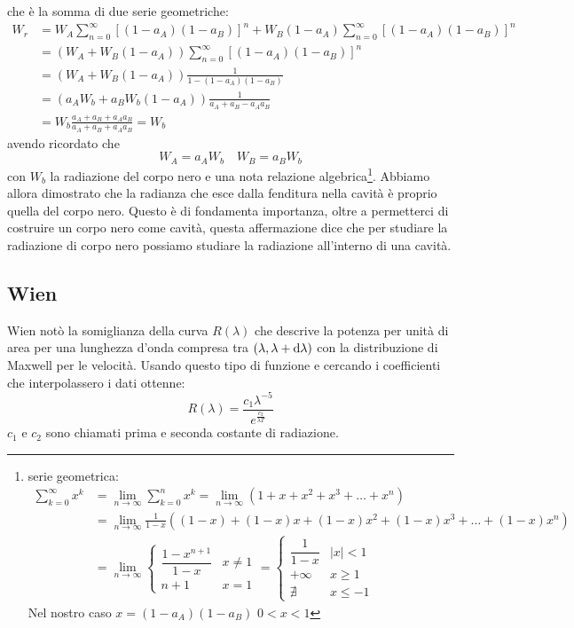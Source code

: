 che è la somma di due serie geometriche:
\begin{equation}
	\begin{split}
		W_r&=W_A\sum_{n=0}^\infty\left[(1-a_A)(1-a_B)\right]^n+W_B(1-a_A)\sum_{n=0}^\infty\left[(1-a_A)(1-a_B)\right]^n\\
		&=\left(W_A+W_B\left(1-a_A\right)\right)\sum_{n=0}^\infty\left[(1-a_A)(1-a_B)\right]^n\\
		&=\left(W_A+W_B\left(1-a_A\right)\right)\frac{1}{1-(1-a_A)(1-a_B)}\\
		&=\left(a_AW_b+a_BW_b(1-a_A)\right)\frac{1}{a_A+a_B-a_Aa_B}\\
		&=W_b\frac{a_A+a_B+a_Aa_B}{a_A+a_B+a_Aa_B}=W_b
	\end{split}
\end{equation}
avendo ricordato che
\[
	W_A=a_AW_b\quad W_B=a_BW_b
\]
con $W_b$ la radiazione del corpo nero e una nota relazione algebrica\footnote{serie geometrica:
	\begin{equation}
		\begin{split}
			\sum_{k=0}^\infty x^k&=\lim_{n\to\infty}\sum_{k=0}^n x^k=\lim_{n\to\infty}\left(1+x+x^2+x^3+\ldots+x^n\right)\\
			&=\lim_{n\to\infty}\frac{1}{1-x}\left((1-x)+(1-x)x+(1-x)x^2+(1-x)x^3+\ldots+(1-x)x^n\right)\\
			&=\lim_{n\to\infty}
			\left\{
			\begin{array}{ll}
				\dfrac{1-x^{n+1}}{1-x} & x\neq 1 \\
				n+1                    & x=1
			\end{array}
			\right.=
			\left\{
			\begin{array}{ll}
				\dfrac{1}{1-x} & |x|<1    \\
				+\infty        & x\geq 1  \\
				\nexists       & x\leq -1
			\end{array}
			\right.
		\end{split}
	\end{equation}
	Nel nostro caso $x=(1-a_A)(1-a_B)$ $0<x<1$
}. Abbiamo allora dimostrato che la radianza che esce dalla fenditura nella cavità è proprio quella del corpo nero. Questo è di fondamenta importanza, oltre a permetterci di costruire un corpo nero come cavità, questa affermazione dice che per studiare la radiazione di corpo nero possiamo studiare la radiazione all'interno di una cavità.
\subsection{Wien}
Wien notò la somiglianza della curva $R(\lambda)$ che descrive la potenza per unità di area per una lunghezza d'onda compresa tra $(\lambda,\lambda+\mathrm{d}\lambda)$ con la distribuzione di Maxwell per le velocità. Usando questo tipo di funzione e cercando i coefficienti che interpolassero i dati ottenne:
\begin{equation}
	R(\lambda)=\frac{c_1\lambda^{-5}}{e^{\frac{c_2}{\lambda T}}}
\end{equation}
$c_1$ e $c_2$ sono chiamati prima e seconda costante di radiazione.
